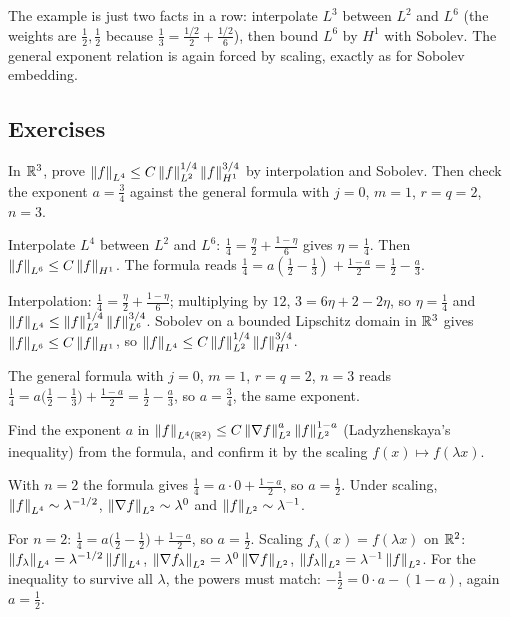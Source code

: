 The example is just two facts in a row: interpolate $L^3$ between $L^2$ and $L^6$ (the weights are $\frac12,\frac12$ because $\frac13 = \frac{1/2}{2} + \frac{1/2}{6}$), then bound $L^6$ by $H^1$ with Sobolev. The general exponent relation is again forced by scaling, exactly as for Sobolev embedding.

\subsection*{Exercises}

\begin{exercise}
  In $\mathbb{R}^3$, prove $\left\lVert f\right\rVert_{L^4} \le C\left\lVert f\right\rVert_{L^2}^{1/4}\left\lVert f\right\rVert_{H^1}^{3/4}$ by interpolation and Sobolev. Then check the exponent $a = \frac34$ against the general formula with $j = 0$, $m = 1$, $r = q = 2$, $n = 3$.
  \begin{hint}
    Interpolate $L^4$ between $L^2$ and $L^6$: $\frac14 = \frac{\eta}{2} + \frac{1-\eta}{6}$ gives $\eta = \frac14$. Then $\left\lVert f\right\rVert_{L^6} \le C\left\lVert f\right\rVert_{H^1}$. The formula reads $\frac14 = a(\frac12 - \frac13) + \frac{1-a}{2} = \frac12 - \frac a3$.
  \end{hint}
  \begin{solution}
    Interpolation: $\frac14 = \frac\eta2 + \frac{1-\eta}{6}$; multiplying by $12$, $3 = 6\eta + 2 - 2\eta$, so $\eta = \frac14$ and $\left\lVert f\right\rVert_{L^4} \le \left\lVert f\right\rVert_{L^2}^{1/4}\left\lVert f\right\rVert_{L^6}^{3/4}$. Sobolev on a bounded Lipschitz domain in $\mathbb{R}^3$ gives $\left\lVert f\right\rVert_{L^6} \le C\left\lVert f\right\rVert_{H^1}$, so $\left\lVert f\right\rVert_{L^4} \le C\left\lVert f\right\rVert_{L^2}^{1/4}\left\lVert f\right\rVert_{H^1}^{3/4}$.

    The general formula with $j = 0$, $m = 1$, $r = q = 2$, $n = 3$ reads $\frac14 = a\big(\frac12 - \frac13\big) + \frac{1-a}{2} = \frac12 - \frac a3$, so $a = \frac34$, the same exponent.
  \end{solution}
\end{exercise}

\begin{exercise}
  Find the exponent $a$ in $\left\lVert f\right\rVert_{L^4(\mathbb{R}^2)} \le C\left\lVert \nabla f\right\rVert_{L^2}^{a}\left\lVert f\right\rVert_{L^2}^{1-a}$ (Ladyzhenskaya's inequality) from the formula, and confirm it by the scaling $f(x) \mapsto f(\lambda x)$.
  \begin{hint}
    With $n = 2$ the formula gives $\frac14 = a\cdot 0 + \frac{1-a}{2}$, so $a = \frac12$. Under scaling, $\left\lVert f\right\rVert_{L^4} \sim \lambda^{-1/2}$, $\left\lVert \nabla f\right\rVert_{L^2} \sim \lambda^0$ and $\left\lVert f\right\rVert_{L^2} \sim \lambda^{-1}$.
  \end{hint}
  \begin{solution}
    For $n = 2$: $\frac14 = a\big(\frac12 - \frac12\big) + \frac{1-a}{2}$, so $a = \frac12$. Scaling $f_\lambda(x) = f(\lambda x)$ on $\mathbb{R}^2$: $\left\lVert f_\lambda\right\rVert_{L^4} = \lambda^{-1/2}\left\lVert f\right\rVert_{L^4}$, $\left\lVert \nabla f_\lambda\right\rVert_{L^2} = \lambda^{0}\left\lVert \nabla f\right\rVert_{L^2}$, $\left\lVert f_\lambda\right\rVert_{L^2} = \lambda^{-1}\left\lVert f\right\rVert_{L^2}$. For the inequality to survive all $\lambda$, the powers must match: $-\frac12 = 0\cdot a - (1-a)$, again $a = \frac12$.
  \end{solution}
\end{exercise}

